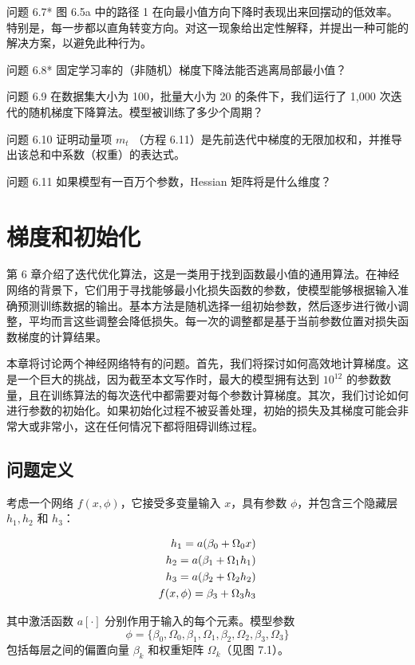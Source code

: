 \documentclass[lang=cn,newtx,10pt,scheme=chinese]{elegantbook}
\begin{document}
问题 6.7* 图 6.5a 中的路径 1 在向最小值方向下降时表现出来回摆动的低效率。特别是，每一步都以直角转变方向。对这一现象给出定性解释，并提出一种可能的解决方案，以避免此种行为。

问题 6.8* 固定学习率的（非随机）梯度下降法能否逃离局部最小值？

问题 6.9 在数据集大小为 100，批量大小为 20 的条件下，我们运行了 1,000 次迭代的随机梯度下降算法。模型被训练了多少个周期？

问题 6.10 证明动量项 \(m_t\) （方程 6.11）是先前迭代中梯度的无限加权和，并推导出该总和中系数（权重）的表达式。

问题 6.11 如果模型有一百万个参数，Hessian 矩阵将是什么维度？

\chapter{梯度和初始化}
第 6 章介绍了迭代优化算法，这是一类用于找到函数最小值的通用算法。在神经网络的背景下，它们用于寻找能够最小化损失函数的参数，使模型能够根据输入准确预测训练数据的输出。基本方法是随机选择一组初始参数，然后逐步进行微小调整，平均而言这些调整会降低损失。每一次的调整都是基于当前参数位置对损失函数梯度的计算结果。

本章将讨论两个神经网络特有的问题。首先，我们将探讨如何高效地计算梯度。这是一个巨大的挑战，因为截至本文写作时，最大的模型拥有达到 $10^{12}$ 的参数数量，且在训练算法的每次迭代中都需要对每个参数计算梯度。其次，我们讨论如何进行参数的初始化。如果初始化过程不被妥善处理，初始的损失及其梯度可能会非常大或非常小，这在任何情况下都将阻碍训练过程。

\section{问题定义}

考虑一个网络 \(f(x, \phi)\)，它接受多变量输入 \(x\)，具有参数 \(\phi\)，并包含三个隐藏层 \(h_1, h_2\) 和 \(h_3\)：

\begin{align}
h_1 = a(\beta_0 + \Omega_0x) \notag \\
h_2 = a(\beta_1 + \Omega_1h_1) \notag \\
h_3 = a(\beta_2 + \Omega_2h_2) \notag \\
f(x, \phi) = \beta_3 + \Omega_3h_3 
\end{align} 

其中激活函数 \(a[\cdot]\) 分别作用于输入的每个元素。模型参数 
\begin{equation*}
\phi = \{\beta_0,\Omega_0,\beta_1,\Omega_1,\beta_2,\Omega_2,\beta_3,\Omega_3\}    
\end{equation*}
包括每层之间的偏置向量 \(\beta_k\) 和权重矩阵 \(\Omega_k\)（见图 7.1）。
\end{document}
